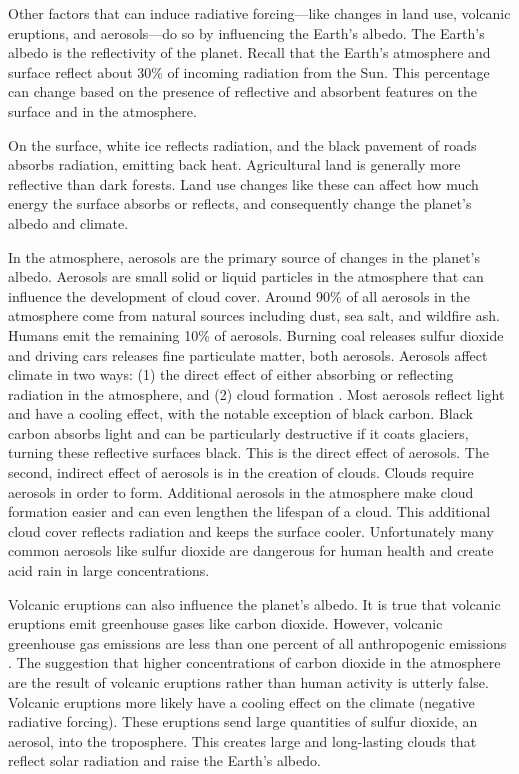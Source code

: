 Other factors that can induce radiative forcing---like changes in land use, volcanic eruptions, and aerosols---do so by influencing the Earth's albedo. The Earth's albedo is the reflectivity of the planet. Recall that the Earth's atmosphere and surface reflect about 30\% of incoming radiation from the Sun. This percentage can change based on the presence of reflective and absorbent features on the surface and in the atmosphere. 

On the surface, white ice reflects radiation, and the black pavement of roads absorbs radiation, emitting back heat. Agricultural land is generally more reflective than dark forests. Land use changes like these can affect how much energy the surface absorbs or reflects, and consequently change the planet's albedo and climate. 

In the atmosphere, aerosols are the primary source of changes in the planet's albedo. Aerosols are small solid or liquid particles in the atmosphere that can influence the development of cloud cover. Around 90\% of all aerosols in the atmosphere come from natural sources including dust, sea salt, and  wildfire ash. Humans emit the remaining 10\% of aerosols. Burning coal releases sulfur dioxide and driving cars releases fine particulate matter, both aerosols. Aerosols affect climate in two ways: (1) the direct effect of either absorbing or reflecting radiation in the atmosphere, and (2) cloud formation \citep{gfdl}. Most aerosols reflect light and have a cooling effect, with the notable exception of black carbon. Black carbon absorbs light and can be particularly destructive if it coats glaciers, turning these reflective surfaces black. This is the direct effect of aerosols. The second, indirect effect of aerosols is in the creation of clouds. Clouds require aerosols in order to form. Additional aerosols in the atmosphere make cloud formation easier and can even lengthen the lifespan of a cloud. This additional cloud cover reflects radiation and keeps the surface cooler. Unfortunately many common aerosols like sulfur dioxide are dangerous for human health and create acid rain in large concentrations. 

Volcanic eruptions can also influence the planet's albedo. It is true that volcanic eruptions emit greenhouse gases like carbon dioxide. However, volcanic greenhouse gas emissions are less than one percent of all anthropogenic emissions \citep{usgs, gerlach2011volcanic}. The suggestion that higher concentrations of carbon dioxide in the atmosphere are the result of volcanic eruptions rather than human activity is utterly false. Volcanic eruptions more likely have a cooling effect on the climate (negative radiative forcing). These eruptions send large quantities of sulfur dioxide, an aerosol, into the troposphere. This creates large and long-lasting clouds that reflect solar radiation and raise the Earth's albedo. 

